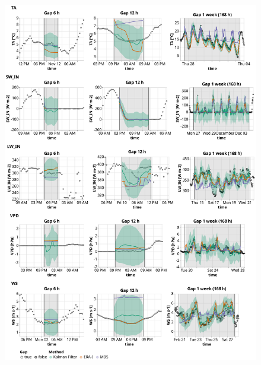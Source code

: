 \documentclass{article}
\newcommand{\imgwidth}{6in}
\let\Oldsubsection\subsection
\renewcommand{\subsection}{\FloatBarrier\Oldsubsection}
\begin{document}
\newcommand{\CapTheTableStand}{Imputation performance of the Kalman filter in comparison to the state-of-the-art
methods: ERA-Interim (ERA-I) and Marginal Distribution Sampling (MDS), using mean and standard deviation of the \textit{Root Mean Square Error} (RMSE). The best method for each gap length is highlighted in bold. For each combination of gap length and variable, 500 artificial gaps were created.}


\begin{figure}
\centerline{\includegraphics[width=\imgwidth]{timeseries_1_1}}
\caption{}
\label{fig:ts_2-1}
\end{figure}
\end{document}
